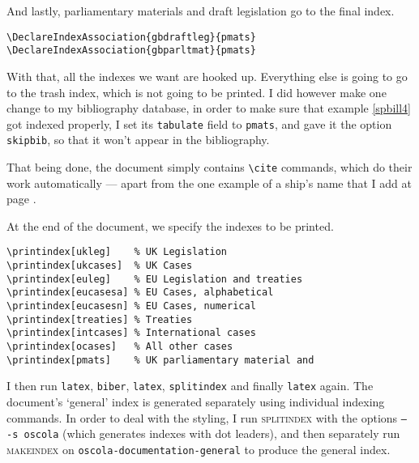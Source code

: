 \documentclass[a5paper,fontsize=9pt,DIV=1]{scrartcl}
\begin{document}
And lastly, parliamentary materials and draft legislation go to the final index.
\begin{verbatim}
\DeclareIndexAssociation{gbdraftleg}{pmats}
\DeclareIndexAssociation{gbparltmat}{pmats}
\end{verbatim}

With that, all the indexes we want are hooked up. Everything else is going to go to the trash index, which is not going to be printed. I did however make one change to my bibliography database, in order to make sure that example \ref{spbill4} got indexed properly, I set its \texttt{tabulate} field to \texttt{pmats}, and gave it the option \texttt{skipbib}, so that it won't appear in the bibliography.

That being done, the document simply contains \verb|\cite| commands, which do their work automatically --- apart from the one example of a ship's name that I add at page \pageref{antaios85}.

At the end of the document, we specify the indexes to be printed.

\begin{verbatim}
\printindex[ukleg]    % UK Legislation
\printindex[ukcases]  % UK Cases
\printindex[euleg]    % EU Legislation and treaties
\printindex[eucasesa] % EU Cases, alphabetical
\printindex[eucasesn] % EU Cases, numerical
\printindex[treaties] % Treaties
\printindex[intcases] % International cases
\printindex[ocases]   % All other cases
\printindex[pmats]    % UK parliamentary material and
\end{verbatim}

I then run \texttt{latex}, \texttt{biber}, \texttt{latex}, \texttt{splitindex} and finally \texttt{latex} again. The document's `general' index is generated separately using individual indexing commands. In order to deal with the styling, I run \textsc{splitindex} with the options \texttt{-- -s oscola} (which generates indexes with dot leaders), and then separately run \textsc{makeindex} on \texttt{oscola-documentation-general} to produce the general index.
\end{document}
